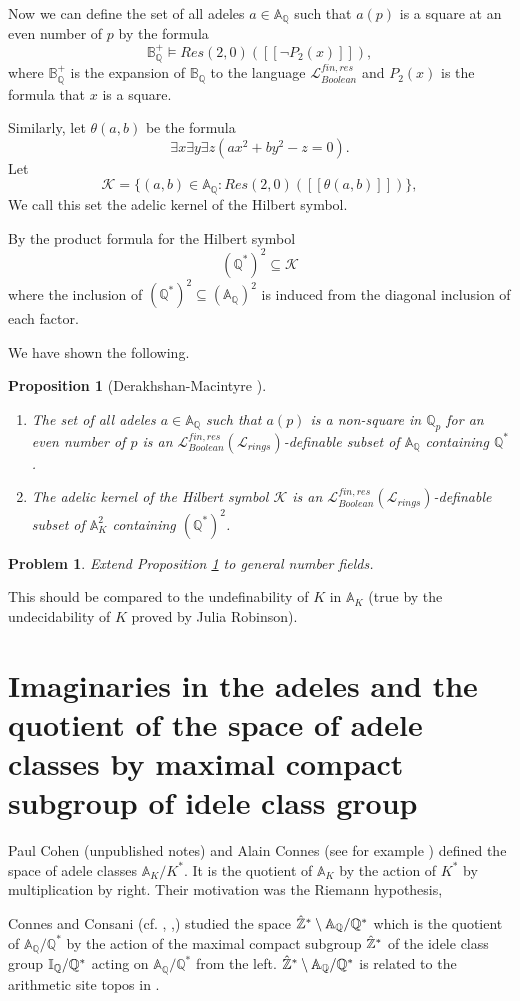 \documentclass[12pt]{amsart}
\def\A{\mathbb{A}}
\def\B{\mathbb{B}}
\def\cL{\mathcal{L}}
\def\Q{\mathbb{Q}}
\def\cL{\mathcal{L}}
\newtheorem{prop}{Proposition}[section]
\numberwithin{equation}{section}
\newtheorem{prob}{Problem}[section]
\begin{document}
Now we can define the set of all adeles $a\in \A_{\Q}$ such that $a(p)$ is a square at an even number of $p$ by the formula
$$\B_{\Q}^+\models Res(2,0)([[\neg P_2(x)]]),$$
where $\B_{\Q}^+$ is the expansion of $\B_{\Q}$ to the language $\cL^{fin,res}_{Boolean}$ and 
$P_2(x)$ is the formula that $x$ is a square. 

Similarly, let $\theta(a,b)$ be the formula $$\exists x \exists y \exists z (ax^2+by^2-z=0).$$
Let 
$$\mathcal{K}=\{(a,b)\in \A_{\Q}: Res(2,0)([[\theta(a,b)]])\},$$
We call this set the adelic kernel of the Hilbert symbol. 

By the product formula for the Hilbert symbol
$$(\Q^*)^2 \subseteq \mathcal{K}$$
where the inclusion of $(\Q^*)^2 \subseteq (\A_{\Q})^2$ is induced from the diagonal inclusion of each factor. 

We have shown the following.
\begin{prop} [Derakhshan-Macintyre {\cite{DM-ad}}] \label{hilb}\noindent
\begin{enumerate}
\item The set of all adeles $a\in \A_{\Q}$ such that $a(p)$ is a non-square in $\Q_p$ for an even number of $p$ is an $\cL^{fin,res}_{Boolean}(\cL_{rings})$-definable subset of $\A_{\Q}$ containing $\Q^*$.
\item The adelic kernel of the Hilbert symbol 
$\mathcal{K}$ is an $\cL^{fin,res}_{Boolean}(\cL_{rings})$-definable subset of $\A_K^2$ containing $(\Q^*)^2$.\end{enumerate}\end{prop}

\begin{prob} Extend Proposition \ref{hilb} to general number fields.\end{prob}
This should be compared to the undefinability of $K$ in $\A_K$ (true by the undecidability of $K$ proved by Julia Robinson).

\section{\bf Imaginaries in the adeles and the quotient of the space of adele classes by maximal compact subgroup of idele class group}\label{ssec-adcl} 
Paul Cohen (unpublished notes) and Alain Connes (see for example \cite{connes-selecta}) defined the space of adele classes 
$\A_K/K^*$. It is the quotient of $\A_K$ by the action of $K^*$ by multiplication by right. Their motivation was the Riemann hypothesis, 

Connes and Consani (cf. \cite{connes-c-site}, \cite{CC2},\cite{CC}) studied the space $\hat{\Bbb Z}^*\setminus\A_{\Q} /\Q^{*}$ which is the quotient of $\A_{\Q}/{\Q}^*$ by the action of the maximal compact subgroup $\hat{\Bbb Z}^*$ of the idele class group $\Bbb I_{\Q}/\Q^*$ acting on $\A_{\Q}/{\Q}^*$ from the left. $\hat{\Bbb Z}^*\setminus\A_{\Q} /\Q^{*}$ is related to the arithmetic site topos in \cite{connes-c-site}.
\end{document}
